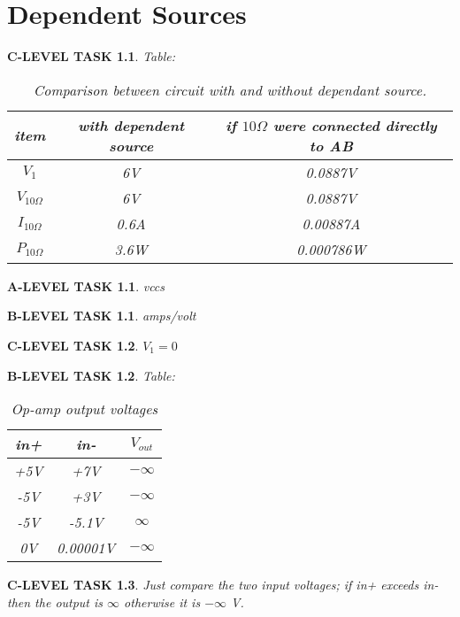 \documentclass{book}
\numberwithin{equation}{section}
\newtheorem{alevel}{A-LEVEL TASK}
\newtheorem{blevel}{B-LEVEL TASK}
\newtheorem{clevel}{C-LEVEL TASK}
\theoremstyle{definition}
\begin{document}
\chapter{Dependent Sources}
\begin{clevel} Table:\par
\begin{table}[H]
\begin{center}
\begin{tabular}{|c|c|c|} \hline
item&with dependent source&if $10\Omega$ were connected directly to AB \\ \hline
$V_1$&6V&0.0887V \\ \hline
$V_{10\Omega}$&6V&0.0887V \\ \hline
$I_{10\Omega}$&0.6A&0.00887A\\ \hline
$P_{10\Omega}$&3.6W&0.000786W \\ \hline
\end{tabular}
\caption{Comparison between circuit with and without dependant source.}
\label{T:5DS}
\end{center}
\end{table}
\end{clevel}

\begin{alevel}vccs\end{alevel}
\begin{blevel}amps/volt\end{blevel}
\begin{clevel}$V_1=0$\end{clevel}

\begin{blevel} Table:\par
\begin{table}[H]
\begin{center}
\begin{tabular}{|c|c|c|}\hline
in+&in-&$V_{out}$\\ \hline
+5V&+7V& $-\infty$\\ \hline
-5V&+3V& $-\infty$\\ \hline
-5V&-5.1V& $\infty$\\ \hline
0V&0.00001V& $-\infty$\\ \hline
\end{tabular}
\caption{Op-amp output voltages}
\label{T:5OP}
\end{center}
\end{table}
\end{blevel}

\begin{clevel}Just compare the two input voltages; if in+ exceeds in- then the output is $\infty$ otherwise it is $-\infty$ V.\end{clevel}
\end{document}
